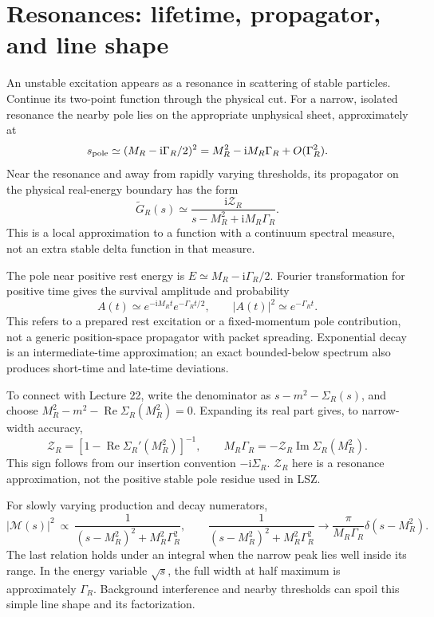 \documentclass[11pt]{article}
\newcommand{\ii}{\mathrm i}
\newcommand{\module}[1]{\clearpage\section{#1}}
\newcommand{\cM}{\mathcal M}
\begin{document}
\module{Resonances: lifetime, propagator, and line shape}
An unstable excitation appears as a resonance in scattering of stable
particles. Continue its two-point function through the physical cut.
For a narrow, isolated resonance the nearby pole lies on the appropriate
unphysical sheet, approximately at
\begin{equation}
 s_{\rm pole}\simeq(M_R-\ii\Gamma_R/2)^2
 =M_R^2-\ii M_R\Gamma_R+O(\Gamma_R^2).
\end{equation}
Near the resonance and away from rapidly varying thresholds, its
propagator on the physical real-energy boundary has the form
\begin{equation}
 \widetilde G_R(s)\simeq
 \frac{\ii\mathcal Z_R}{s-M_R^2+\ii M_R\Gamma_R}.
 \label{eq:resprop}
\end{equation}
This is a local approximation to a function with a continuum spectral
measure, not an extra stable delta function in that measure.

The pole near positive rest energy is \(E\simeq M_R-\ii\Gamma_R/2\).
Fourier transformation for positive time gives the survival amplitude
and probability
\begin{equation}
 A(t)\simeq e^{-\ii M_Rt}e^{-\Gamma_Rt/2},\qquad
 |A(t)|^2\simeq e^{-\Gamma_Rt}.
 \label{eq:survival}
\end{equation}
This refers to a prepared rest excitation or a fixed-momentum pole
contribution, not a generic position-space propagator with packet spreading.
Exponential decay is an intermediate-time approximation; an exact
bounded-below spectrum also produces short-time and late-time deviations.

To connect with Lecture 22, write the denominator as
\(s-m^2-\Sigma_R(s)\), and choose \(M_R^2-m^2-\operatorname{Re}\Sigma_R(M_R^2)=0\).
Expanding its real part gives, to narrow-width accuracy,
\begin{equation}
 \mathcal Z_R=[1-\operatorname{Re}\Sigma_R'(M_R^2)]^{-1},\qquad
 M_R\Gamma_R=-\mathcal Z_R\operatorname{Im}\Sigma_R(M_R^2).
\end{equation}
This sign follows from our insertion convention \(-\ii\Sigma_R\).
\(\mathcal Z_R\) here is a resonance approximation, not the positive stable
pole residue used in LSZ.

For slowly varying production and decay numerators,
\begin{equation}
 |\cM(s)|^2\ \propto\ \frac{1}{(s-M_R^2)^2+M_R^2\Gamma_R^2},\qquad
 \frac{1}{(s-M_R^2)^2+M_R^2\Gamma_R^2}
 \longrightarrow\frac{\pi}{M_R\Gamma_R}\delta(s-M_R^2).
\end{equation}
The last relation holds under an integral when the narrow peak lies well
inside its range. In the energy variable \(\sqrt{s}\), the full width at
half maximum is approximately \(\Gamma_R\). Background interference and
nearby thresholds can spoil this simple line shape and its factorization.
\end{document}
